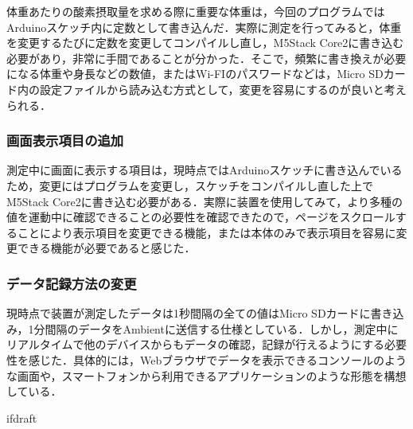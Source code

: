 体重あたりの酸素摂取量を求める際に重要な体重は，今回のプログラムではArduinoスケッチ内に定数として書き込んだ．実際に測定を行ってみると，体重を変更するたびに定数を変更してコンパイルし直し，M5Stack Core2に書き込む必要があり，非常に手間であることが分かった．そこで，頻繁に書き換えが必要になる体重や身長などの数値，またはWi-FIのパスワードなどは，Micro SDカード内の設定ファイルから読み込む方式として，変更を容易にするのが良いと考えられる．

\subsubsection{画面表示項目の追加}

測定中に画面に表示する項目は，現時点ではArduinoスケッチに書き込んでいるため，変更にはプログラムを変更し，スケッチをコンパイルし直した上でM5Stack Core2に書き込む必要がある．実際に装置を使用してみて，より多種の値を運動中に確認できることの必要性を確認できたので，ページをスクロールすることにより表示項目を変更できる機能，または本体のみで表示項目を容易に変更できる機能が必要であると感じた．

\subsubsection{データ記録方法の変更}

現時点で装置が測定したデータは1秒間隔の全ての値はMicro SDカードに書き込み，1分間隔のデータをAmbientに送信する仕様としている．しかし，測定中にリアルタイムで他のデバイスからもデータの確認，記録が行えるようにする必要性を感じた．具体的には，Webブラウザでデータを表示できるコンソールのような画面や，スマートフォンから利用できるアプリケーションのような形態を構想している．

\expandafter\ifx\csname ifdraft\endcsname\relax
  
\fi
